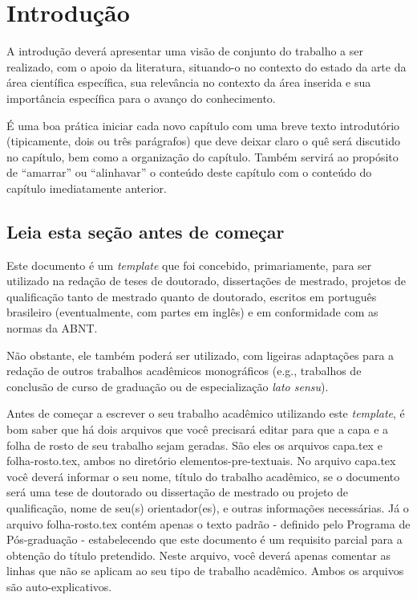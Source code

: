 
\chapter{Introdução}
\label{chap_introducao}

A introdução deverá apresentar uma visão de conjunto do trabalho a ser realizado, com o apoio da literatura, situando-o no contexto do estado da arte da área científica específica, sua relevância no contexto da área inserida e sua importância específica para o avanço do conhecimento.

É uma boa prática iniciar cada novo capítulo com uma breve texto introdutório (tipicamente, dois ou três parágrafos) que deve deixar claro o quê será discutido no capítulo, bem como a organização do capítulo.
Também servirá ao propósito de ``amarrar'' ou ``alinhavar'' o conteúdo deste capítulo com o conteúdo do capítulo imediatamente anterior.

\section{Leia esta seção antes de começar}
\label{sec_leia_esta_secao_antes_de_omecar}

Este documento é um \emph{template} que foi concebido, primariamente, para ser utilizado na redação de teses de doutorado, dissertações de mestrado, projetos de qualificação tanto de mestrado quanto de doutorado, escritos em português brasileiro (eventualmente, com partes em inglês) e em conformidade com as normas da ABNT.

Não obstante, ele também poderá ser utilizado, com ligeiras adaptações para a redação de outros trabalhos acadêmicos monográficos (e.g., trabalhos de conclusão de curso de graduação ou de especialização \emph{lato sensu}).

Antes de começar a escrever o seu trabalho acadêmico utilizando este \emph{template}, é bom saber que há dois arquivos que você precisará editar para que a capa e a folha de rosto de seu trabalho sejam geradas.
São eles os arquivos {\ttfamily capa.tex} e {\ttfamily folha-rosto.tex}, ambos no diretório {\ttfamily elementos-pre-textuais}.
No arquivo {\ttfamily capa.tex} você deverá informar o seu nome, título do trabalho acadêmico, se o documento será uma tese de doutorado ou dissertação de mestrado ou projeto de qualificação, nome de seu(s) orientador(es), e outras informações necessárias.
Já o arquivo {\ttfamily folha-rosto.tex} contém apenas o texto padrão - definido pelo Programa de Pós-graduação - estabelecendo que este documento é um requisito parcial para a obtenção do título pretendido.
Neste arquivo, você deverá apenas comentar as linhas que não se aplicam ao seu tipo de trabalho acadêmico.
Ambos os arquivos são auto-explicativos.

